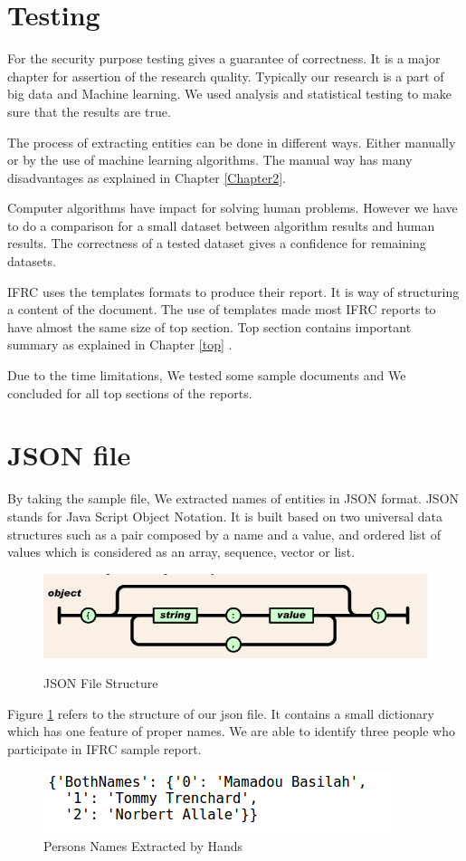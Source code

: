 \newpage
\section{Testing}\label{chp4}
For the security purpose testing gives a guarantee of correctness.  It is a major chapter for assertion of the research quality. Typically our research is a part of big data and Machine learning. We used analysis and statistical testing to make sure that the results are true.

The process of extracting entities can be done in different ways. Either manually or by the use of machine learning algorithms. The manual way has many disadvantages as explained in Chapter \ref{Chapter2}.

Computer algorithms have impact for solving human problems. However we have to do a comparison for a small dataset between algorithm results and human results. The correctness of a tested dataset gives a confidence for remaining datasets.

IFRC uses the templates formats to produce their report. It is way of structuring a content of the document. The use of templates made most IFRC reports to have almost  the same size of top section. Top section contains important summary  as explained in Chapter \ref{top} .

Due to the time limitations, We tested  some  sample documents and We concluded for all top sections of the reports.
\section*{JSON file }
By taking the sample file, We extracted names of entities in JSON format. JSON stands for Java Script Object Notation. It is built based on two universal data structures such as a pair composed by a name and a value, and ordered list of values which is considered as an array, sequence, vector or list.
\begin{figure}[hbtp]
\caption{JSON File Structure}
\centering
\includegraphics[scale=.7]{images/json.png}\label{json}
\end{figure}


Figure \ref{json}
refers to the structure of our json file. It contains a small dictionary which has one feature of proper names. We are able to identify three people who participate in IFRC sample report.
\newpage 
\begin{figure}[hbtp]
\centering
\includegraphics[scale=.7]{images/BothNames.png}
\caption{Persons Names Extracted by Hands}\label{Hand}
\end{figure}

